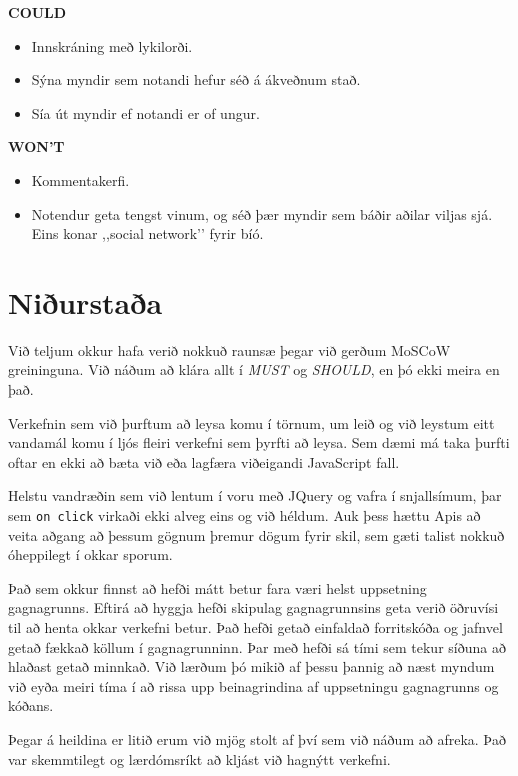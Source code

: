 \documentclass[a4paper,oneside]{article}
\begin{document}
\noindent\textbf{COULD}
\begin{itemize}
    \item Innskráning með lykilorði.
    \item Sýna myndir sem notandi hefur séð á ákveðnum stað.
    \item Sía út myndir ef notandi er of ungur.
\end{itemize}

\noindent\textbf{WON'T}
\begin{itemize}
    \item Kommentakerfi.
    \item Notendur geta tengst vinum, og séð þær myndir sem báðir aðilar viljas sjá.
        Eins konar ,,social network’’ fyrir bíó.
\end{itemize}

\section{Niðurstaða}
Við teljum okkur hafa verið nokkuð raunsæ þegar við gerðum MoSCoW greininguna. 
Við náðum að klára allt í \emph{MUST} og \emph{SHOULD}, en þó ekki meira en það. 

Verkefnin sem við þurftum að leysa komu í törnum, um leið og við leystum
eitt vandamál komu í ljós fleiri verkefni sem þyrfti að leysa.
Sem dæmi má taka þurfti oftar en ekki að bæta við eða lagfæra viðeigandi JavaScript fall.

Helstu vandræðin sem við lentum í voru með JQuery og vafra í snjallsímum, þar sem
\texttt{on click} virkaði ekki alveg eins og við héldum. Auk þess hættu Apis að 
veita aðgang að þessum gögnum þremur dögum fyrir skil, sem gæti talist nokkuð óheppilegt
í okkar sporum. 

Það sem okkur finnst að hefði mátt betur fara væri helst uppsetning gagnagrunns. Eftirá að hyggja hefði skipulag gagnagrunnsins geta verið öðruvísi til að henta okkar verkefni betur. Það hefði getað einfaldað forritskóða og jafnvel getað fækkað köllum í gagnagrunninn. Þar með hefði sá tími sem tekur síðuna að hlaðast getað minnkað. Við lærðum þó mikið af þessu þannig að næst myndum við eyða meiri tíma í að rissa upp beinagrindina af uppsetningu gagnagrunns og kóðans.

Þegar á heildina er litið erum við mjög stolt af því sem við náðum að afreka. Það var skemmtilegt og lærdómsríkt að kljást við hagnýtt verkefni. 
\end{document}
